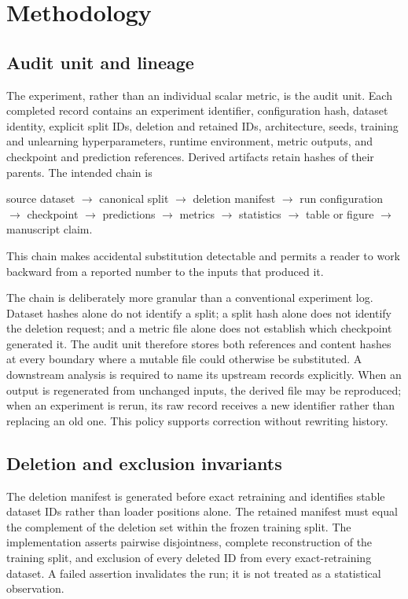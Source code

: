 \section{Methodology}
\subsection{Audit unit and lineage}
The experiment, rather than an individual scalar metric, is the audit unit. Each completed
record contains an experiment identifier, configuration hash, dataset identity, explicit
split IDs, deletion and retained IDs, architecture, seeds, training and unlearning
hyperparameters, runtime environment, metric outputs, and checkpoint and prediction
references. Derived artifacts retain hashes of their parents. The intended chain is
\begin{center}
source dataset $\rightarrow$ canonical split $\rightarrow$ deletion manifest
$\rightarrow$ run configuration $\rightarrow$ checkpoint $\rightarrow$ predictions
$\rightarrow$ metrics $\rightarrow$ statistics $\rightarrow$ table or figure
$\rightarrow$ manuscript claim.
\end{center}
This chain makes accidental substitution detectable and permits a reader to work backward
from a reported number to the inputs that produced it.

The chain is deliberately more granular than a conventional experiment log. Dataset hashes
alone do not identify a split; a split hash alone does not identify the deletion request; and a
metric file alone does not establish which checkpoint generated it. The audit unit therefore
stores both references and content hashes at every boundary where a mutable file could otherwise
be substituted. A downstream analysis is required to name its upstream records explicitly.
When an output is regenerated from unchanged inputs, the derived file may be reproduced; when
an experiment is rerun, its raw record receives a new identifier rather than replacing an old
one. This policy supports correction without rewriting history.

\subsection{Deletion and exclusion invariants}
The deletion manifest is generated before exact retraining and identifies stable dataset
IDs rather than loader positions alone. The retained manifest must equal the complement of
the deletion set within the frozen training split. The implementation asserts pairwise
disjointness, complete reconstruction of the training split, and exclusion of every
deleted ID from every exact-retraining dataset. A failed assertion invalidates the run; it
is not treated as a statistical observation.

